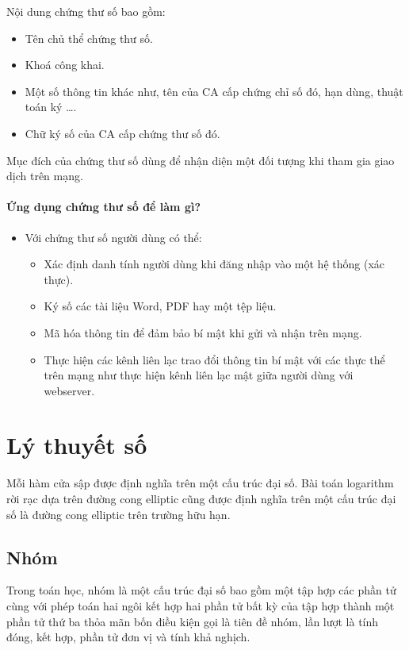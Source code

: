 \documentclass[a4paper,12pt]{report}
\begin{document}
Nội dung chứng thư số bao gồm:
\begin{itemize}
\item Tên chủ thể chứng thư số.
\item Khoá công khai.
\item Một số thông tin khác như, tên của CA cấp chứng chỉ số đó, hạn dùng, thuật toán ký \ldots.
\item Chữ ký số của CA cấp chứng thư số đó.
\end{itemize}

Mục đích của chứng thư số dùng để nhận diện một đối tượng khi tham gia giao dịch trên mạng.

\subsubsection{Ứng dụng chứng thư số để làm gì?}
\begin{itemize}
\item Với chứng thư số người dùng có thể:
\begin{itemize}
\item Xác định danh tính người dùng khi đăng nhập vào một hệ thống (xác thực).
\item Ký số các tài liệu Word, PDF hay một tệp liệu.
\item Mã hóa thông tin để đảm bảo bí mật khi gửi và nhận trên mạng.
\item Thực hiện các kênh liên lạc trao đổi thông tin bí mật với các thực thể trên mạng như thực hiện kênh liên lạc mật giữa người dùng với webserver.
\end{itemize}
\end{itemize}
\chapter{Lý thuyết số}
Mỗi hàm cửa sập được định nghĩa trên một cấu trúc đại số. Bài toán logarithm rời rạc dựa trên đường cong elliptic cũng được định nghĩa trên một cấu trúc đại số là đường cong elliptic trên
trường hữu hạn.
\section{Nhóm}
Trong toán học, nhóm là một cấu trúc đại số bao gồm một tập hợp các phần tử cùng với phép toán hai ngôi kết hợp hai phần tử bất kỳ của tập hợp thành một phần tử thứ ba thỏa mãn bốn điều kiện gọi là tiên đề nhóm, lần lượt là tính đóng, kết hợp, phần tử đơn vị và tính khả nghịch.
\end{document}
